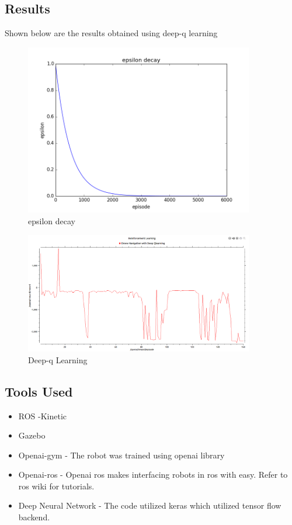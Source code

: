 \documentclass[12pt]{article}
\begin{document}
\subsection{Results}
Shown below are the results obtained using deep-q learning
\begin{figure}[H]
    \centering
    \includegraphics[width=10cm]{epsilon_decay}
    \caption{epsilon decay}
    \label{fig:3D environment created in matplotlib}
\end{figure}

\begin{figure}[H]
    \centering
    \includegraphics[width=10cm]{deepqn.png}
    \caption{Deep-q Learning}
    \label{fig:3D environment created in matplotlib}
\end{figure}

\newpage
\subsection{Tools Used}
\begin{itemize}
  \item ROS -Kinetic
  \item Gazebo 
  \item Openai-gym - The robot was trained using openai library
  \item Openai-ros - Openai ros makes interfacing robots in ros with easy. Refer to ros wiki for tutorials. 
  \item Deep Neural Network - The code utilized keras which utilized tensor flow backend.
\end{itemize}
\end{document}
